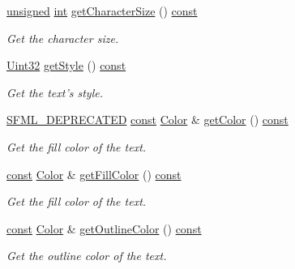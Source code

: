 \begin{DoxyCompactItemize}
\hyperlink{curses_8priv_8h_aca40206900cfc164654362fa8d4ad1e6}{unsigned} \hyperlink{term__entry_8h_ad65b480f8c8270356b45a9890f6499ae}{int} \hyperlink{classsf_1_1_text_a9abb85c6966c9879f6ba4d6e47be1dd5}{get\-Character\-Size} () \hyperlink{term__entry_8h_a57bd63ce7f9a353488880e3de6692d5a}{const} 
\begin{DoxyCompactList}\small\item\em Get the character size. \end{DoxyCompactList}\item 
\hyperlink{namespacesf_aa746fb1ddef4410bddf198ebb27e727c}{Uint32} \hyperlink{classsf_1_1_text_a3f7483a48faf66378da19d36ff6145cf}{get\-Style} () \hyperlink{term__entry_8h_a57bd63ce7f9a353488880e3de6692d5a}{const} 
\begin{DoxyCompactList}\small\item\em Get the text's style. \end{DoxyCompactList}\item 
\hyperlink{sfml_2dep_2_s_f_m_l-2_84_82_2include_2_s_f_m_l_2_config_8hpp_a9d22ae32bba2961ae9abc7e40f035fc7}{S\-F\-M\-L\-\_\-\-D\-E\-P\-R\-E\-C\-A\-T\-E\-D} \hyperlink{term__entry_8h_a57bd63ce7f9a353488880e3de6692d5a}{const} \hyperlink{classsf_1_1_color}{Color} \& \hyperlink{classsf_1_1_text_a0fdc0ff583835760fa44509d1cdd23ff}{get\-Color} () \hyperlink{term__entry_8h_a57bd63ce7f9a353488880e3de6692d5a}{const} 
\begin{DoxyCompactList}\small\item\em Get the fill color of the text. \end{DoxyCompactList}\item 
\hyperlink{term__entry_8h_a57bd63ce7f9a353488880e3de6692d5a}{const} \hyperlink{classsf_1_1_color}{Color} \& \hyperlink{classsf_1_1_text_aa772a3d4b8c6624d2df0ca160d5a5ffa}{get\-Fill\-Color} () \hyperlink{term__entry_8h_a57bd63ce7f9a353488880e3de6692d5a}{const} 
\begin{DoxyCompactList}\small\item\em Get the fill color of the text. \end{DoxyCompactList}\item 
\hyperlink{term__entry_8h_a57bd63ce7f9a353488880e3de6692d5a}{const} \hyperlink{classsf_1_1_color}{Color} \& \hyperlink{classsf_1_1_text_ae51a9175be66a1087a061c3dc3f2c5ae}{get\-Outline\-Color} () \hyperlink{term__entry_8h_a57bd63ce7f9a353488880e3de6692d5a}{const} 
\begin{DoxyCompactList}\small\item\em Get the outline color of the text. \end{DoxyCompactList}\item 

\end{DoxyCompactItemize}
